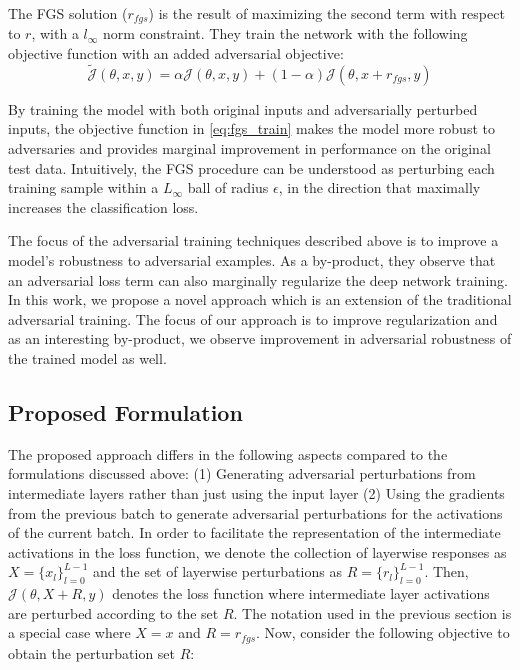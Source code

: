 \documentclass[letterpaper]{article} %
\begin{document}
The FGS solution ($r_{fgs}$) is the result of maximizing the second term with respect to $r$, with a $l_{\infty}$ norm constraint. They train the network with the following objective function with an added adversarial objective:
\begin{equation}
\tilde{\mathcal{J}}(\theta,x,y) = \alpha \mathcal{J}(\theta,x,y)+ (1-\alpha) \mathcal{J}(\theta,x+r_{fgs},y)
\label{eq:fgs_train}
\end{equation}


By training the model with both original inputs and adversarially perturbed inputs, the objective function in \ref{eq:fgs_train} makes the model more robust to adversaries and provides marginal improvement in performance on the original test data. Intuitively, the FGS procedure can be understood as perturbing each training sample within a $L_{\infty}$ ball of radius $\epsilon$, in the direction that maximally increases the classification loss.

The focus of the adversarial training techniques described above is to improve a model's robustness to adversarial examples. As a by-product, they observe that an adversarial loss term can also marginally regularize the deep network training. In this work, we propose a novel approach which is an extension of the traditional adversarial training. The focus of our approach is to improve regularization and as an interesting by-product, we observe improvement in adversarial robustness of the trained model as well.

\subsection{Proposed Formulation}\label{subsec:formulation}
The proposed approach differs in the following aspects compared to the formulations discussed above: (1) Generating adversarial perturbations from intermediate layers rather than just using the input layer (2) Using the gradients from the previous batch to generate adversarial perturbations for the activations of the current batch. In order to facilitate the representation of the intermediate activations in the loss function, we denote the collection of layerwise responses as $X=\{x_l\}_{l=0}^{L-1}$ and  the set of layerwise perturbations as $R=\{r_l\}_{l=0}^{L-1}$. Then, $\mathcal{J}(\theta,X+R,y)$ denotes the loss function where intermediate layer activations are perturbed according to the set $R$. The notation used in the previous section is a special case where $X={x}$ and $R=r_{fgs}$. Now, consider the following objective to obtain the perturbation set $R$:
\end{document}
